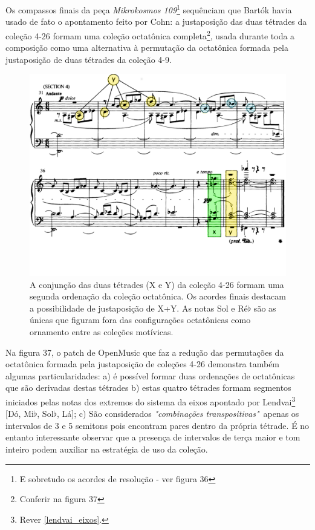 \documentclass[
	12pt,				%
	openright,			%
	twoside,			%
	a4paper,			%
	english,			%
	french,				%
	spanish,			%
	brazil				%
	]{abntex2}
\begin{document}
Os compassos finais da peça \textit{Mikrokosmos 109}\footnote{E sobretudo os acordes de resolução - ver figura 36} sequênciam que Bartók havia usado de fato o apontamento feito por Cohn: a justaposição das duas tétrades da coleção 4-26 formam uma coleção octatônica completa\footnote{Conferir na figura 37}, usada durante toda a composição como uma alternativa à permutação da octatônica formada pela justaposição de duas tétrades da coleção 4-9. 

\begin{figure}[!h]
	\caption{\label{fig_grafico} A conjunção das duas tétrades (X e Y) da coleção 4-26 formam uma segunda ordenação da coleção octatônica. Os acordes finais destacam a possibilidade de justaposição de X+Y. As notas Sol e Ré$\flat$ são as únicas que figuram fora das configurações octatônicas como ornamento entre as coleções motívicas.  }
	\begin{center}
	    \includegraphics[scale=0.3]{octa/mikro_Bali02.png}
	\end{center}
\end{figure}

Na figura 37, o patch de OpenMusic que faz a redução das permutações da octatônica formada pela justaposição de coleções 4-26 demonstra também algumas particularidades: a) é possível formar duas ordenações de octatônicas que são derivadas destas tétrades b) estas quatro tétrades formam segmentos iniciados pelas notas dos extremos do sistema da eixos apontado por Lendvai\footnote{Rever \autoref{lendvai_eixos}. } [Dó, Mi$\flat$, Sol$\flat$, Lá]; c) São considerados \textit{"combinações transpositivas"}\ apenas os intervalos de 3 e 5 semitons pois encontram pares dentro da própria tétrade. É no entanto interessante observar que a presença de intervalos de terça maior e tom inteiro podem auxiliar na estratégia de uso da coleção.
\end{document}
